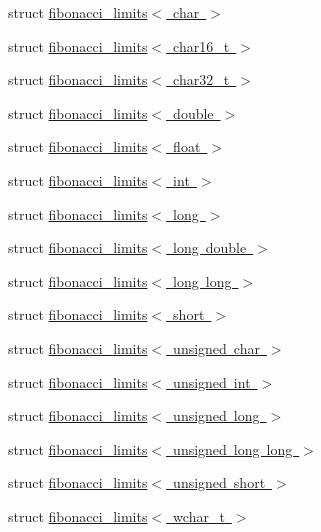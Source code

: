 \begin{DoxyCompactItemize}
struct \mbox{\hyperlink{structsaki_1_1fibonacci__limits_3_01char_01_4}{fibonacci\+\_\+limits$<$ char $>$}}
\item 
struct \mbox{\hyperlink{structsaki_1_1fibonacci__limits_3_01char16__t_01_4}{fibonacci\+\_\+limits$<$ char16\+\_\+t $>$}}
\item 
struct \mbox{\hyperlink{structsaki_1_1fibonacci__limits_3_01char32__t_01_4}{fibonacci\+\_\+limits$<$ char32\+\_\+t $>$}}
\item 
struct \mbox{\hyperlink{structsaki_1_1fibonacci__limits_3_01double_01_4}{fibonacci\+\_\+limits$<$ double $>$}}
\item 
struct \mbox{\hyperlink{structsaki_1_1fibonacci__limits_3_01float_01_4}{fibonacci\+\_\+limits$<$ float $>$}}
\item 
struct \mbox{\hyperlink{structsaki_1_1fibonacci__limits_3_01int_01_4}{fibonacci\+\_\+limits$<$ int $>$}}
\item 
struct \mbox{\hyperlink{structsaki_1_1fibonacci__limits_3_01long_01_4}{fibonacci\+\_\+limits$<$ long $>$}}
\item 
struct \mbox{\hyperlink{structsaki_1_1fibonacci__limits_3_01long_01double_01_4}{fibonacci\+\_\+limits$<$ long double $>$}}
\item 
struct \mbox{\hyperlink{structsaki_1_1fibonacci__limits_3_01long_01long_01_4}{fibonacci\+\_\+limits$<$ long long $>$}}
\item 
struct \mbox{\hyperlink{structsaki_1_1fibonacci__limits_3_01short_01_4}{fibonacci\+\_\+limits$<$ short $>$}}
\item 
struct \mbox{\hyperlink{structsaki_1_1fibonacci__limits_3_01unsigned_01char_01_4}{fibonacci\+\_\+limits$<$ unsigned char $>$}}
\item 
struct \mbox{\hyperlink{structsaki_1_1fibonacci__limits_3_01unsigned_01int_01_4}{fibonacci\+\_\+limits$<$ unsigned int $>$}}
\item 
struct \mbox{\hyperlink{structsaki_1_1fibonacci__limits_3_01unsigned_01long_01_4}{fibonacci\+\_\+limits$<$ unsigned long $>$}}
\item 
struct \mbox{\hyperlink{structsaki_1_1fibonacci__limits_3_01unsigned_01long_01long_01_4}{fibonacci\+\_\+limits$<$ unsigned long long $>$}}
\item 
struct \mbox{\hyperlink{structsaki_1_1fibonacci__limits_3_01unsigned_01short_01_4}{fibonacci\+\_\+limits$<$ unsigned short $>$}}
\item 
struct \mbox{\hyperlink{structsaki_1_1fibonacci__limits_3_01wchar__t_01_4}{fibonacci\+\_\+limits$<$ wchar\+\_\+t $>$}}

\end{DoxyCompactItemize}
